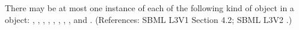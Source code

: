 There may be at most one instance of each of the following kind of object
in a \Model object: {\ListOfFunctionDefinitions,
\ListOfUnitDefinitions, \ListOfCompartments, \ListOfSpecies,
\ListOfParameters, \ListOfInitialAssignments, \ListOfRules,
\ListOfConstraints, \ListOfReactions} and
{\ListOfEvents}. (References: SBML L3V1 Section 4.2; SBML L3V2
.)
